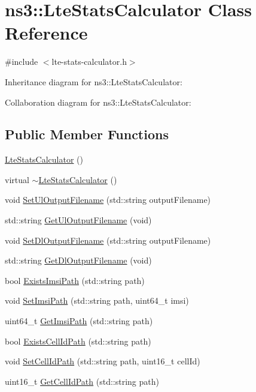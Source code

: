 \hypertarget{classns3_1_1LteStatsCalculator}{}\section{ns3\+:\+:Lte\+Stats\+Calculator Class Reference}
\label{classns3_1_1LteStatsCalculator}


{\ttfamily \#include $<$lte-\/stats-\/calculator.\+h$>$}



Inheritance diagram for ns3\+:\+:Lte\+Stats\+Calculator\+:


Collaboration diagram for ns3\+:\+:Lte\+Stats\+Calculator\+:
\subsection*{Public Member Functions}
\begin{DoxyCompactItemize}
\item 
\hyperlink{classns3_1_1LteStatsCalculator_a4d74204c35bb226063fb38662072b272}{Lte\+Stats\+Calculator} ()
\item 
virtual \hyperlink{classns3_1_1LteStatsCalculator_a7bde86911b6883489b78018026f0a825}{$\sim$\+Lte\+Stats\+Calculator} ()
\item 
void \hyperlink{classns3_1_1LteStatsCalculator_a47ced91f91ab7550e347ee1a933ca998}{Set\+Ul\+Output\+Filename} (std\+::string output\+Filename)
\item 
std\+::string \hyperlink{classns3_1_1LteStatsCalculator_a8091b8aee336d1c4745de3e422b46e40}{Get\+Ul\+Output\+Filename} (void)
\item 
void \hyperlink{classns3_1_1LteStatsCalculator_a1cd704e00a2384ef49fa74a7d29f91c1}{Set\+Dl\+Output\+Filename} (std\+::string output\+Filename)
\item 
std\+::string \hyperlink{classns3_1_1LteStatsCalculator_a022c578ee2e9eca77969f2f63e71bcc9}{Get\+Dl\+Output\+Filename} (void)
\item 
bool \hyperlink{classns3_1_1LteStatsCalculator_a582957a7f41b92f8b271790779cde093}{Exists\+Imsi\+Path} (std\+::string path)
\item 
void \hyperlink{classns3_1_1LteStatsCalculator_a01137e3e26c5c0e3264808aaa0c81fb4}{Set\+Imsi\+Path} (std\+::string path, uint64\+\_\+t imsi)
\item 
uint64\+\_\+t \hyperlink{classns3_1_1LteStatsCalculator_a22fee7f76b23ed2988cda04ce4f33de5}{Get\+Imsi\+Path} (std\+::string path)
\item 
bool \hyperlink{classns3_1_1LteStatsCalculator_a0a54f76f06fed7ae2ce229e920cd3fb6}{Exists\+Cell\+Id\+Path} (std\+::string path)
\item 
void \hyperlink{classns3_1_1LteStatsCalculator_a0937f34f9d1548defa01c8c39b571288}{Set\+Cell\+Id\+Path} (std\+::string path, uint16\+\_\+t cell\+Id)
\item 
uint16\+\_\+t \hyperlink{classns3_1_1LteStatsCalculator_a9065ae77cf62fef11eb7d1792becc2da}{Get\+Cell\+Id\+Path} (std\+::string path)
\end{DoxyCompactItemize}
